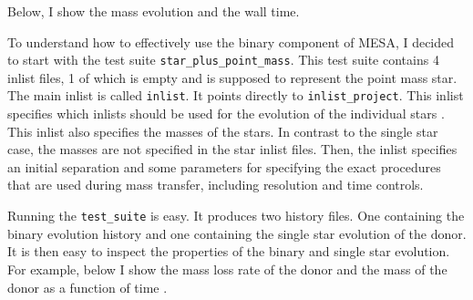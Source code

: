 \documentclass[a4paper,10pt]{article}
\begin{document}
    Below, I show the mass evolution and the wall time.

    \begin{figure}[ht]
        \centering
    \end{figure}
    
    To understand how to effectively use the binary component of MESA, I decided to start with the test suite \lstinline[style=output, breaklines=true]|star_plus_point_mass|.
        This test suite contains 4 inlist files, 1 of which is empty and is supposed to represent the point mass star. The main inlist is called \lstinline[style=output, breaklines=true]|inlist|. It points directly to \lstinline[style=output, breaklines=true]|inlist_project|. This inlist specifies which inlists should be used for the evolution of the individual stars . This inlist also specifies the masses of the stars. In contrast to the single star case, the masses are not specified in the star inlist files. Then, the inlist specifies an initial separation and some parameters for specifying the exact procedures that are used during mass transfer, including resolution and time controls.

    Running the \lstinline[style=output, breaklines=true]|test_suite| is easy. It produces two history files. One containing the binary evolution history and one containing the single star evolution of the donor. It is then easy to inspect the properties of the binary and single star evolution. For example, below I show the mass loss rate of the donor and the mass of the donor as a function of time
    .
\end{document}
